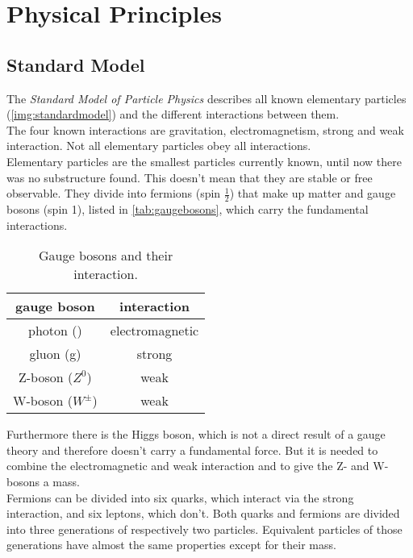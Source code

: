\section{Physical Principles}
\subsection{Standard Model}
The \emph{Standard Model of Particle Physics} describes all known elementary particles (\autoref{img:standardmodel}) and the different 
interactions between them. \\
The four known interactions are gravitation, electromagnetism, strong and weak interaction. Not all elementary particles obey all interactions.\\
Elementary particles are the smallest particles currently known, until now there was no substructure found. 
This doesn't mean that they are stable or free observable. They divide into fermions (spin $\frac{1}{2}$) that make up matter and 
gauge bosons (spin 1), listed in \autoref{tab:gaugebosons}, which carry the fundamental interactions. 
\begin{table}[H]
\caption{Gauge bosons and their interaction.}
\begin{center}
\begin{tabular}{|c|c|}
	\hline
	gauge boson 		& interaction			\\ \hline \hline
	photon (\textgamma) & electromagnetic 		\\ \hline
	gluon (g) 			& strong				\\ \hline
	Z-boson ($Z^0$)		& weak					\\ \hline
	W-boson ($W^\pm$)	& weak					\\ \hline
\end{tabular}
\end{center}
\label{tab:gaugebosons}
\end{table}
Furthermore there is the Higgs boson, which is not a direct result of a gauge theory and 
therefore doesn't carry a fundamental force. But it is needed to combine the electromagnetic and weak interaction and to give the Z- and W-bosons
a mass. \\
Fermions can be divided into six quarks, which interact via the strong interaction, and six leptons, which don't. Both quarks and fermions are 
divided into three generations of respectively two particles. Equivalent particles of those generations have almost the same properties except for 
their mass.
